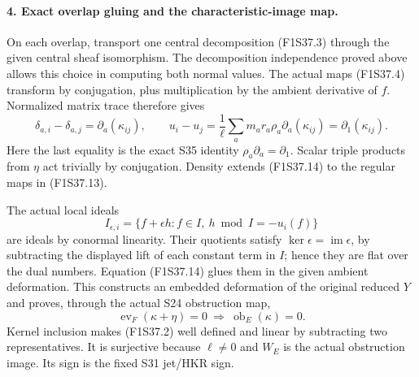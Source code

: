 \paragraph{4. Exact overlap gluing and the characteristic-image map.}
On each overlap, transport one central
decomposition (F1S37.3) through the
given central sheaf isomorphism. The
decomposition independence proved above
allows this choice in computing both
normal values. The actual maps
(F1S37.4) transform by conjugation,
plus multiplication by the ambient
derivative of $f$. Normalized matrix
trace therefore gives
\[
 \delta_{a,i}-\delta_{a,j}
                 =\partial_a(\kappa_{ij}),\qquad
 u_i-u_j=\frac1\ell\sum_a m_a r_a
                    \rho_a\partial_a(\kappa_{ij})
                 =\partial_1(\kappa_{ij}).
 \tag{F1S37.14}
\]
Here the last equality is the exact
S35 identity $\rho_a\partial_a=\partial_1$.
Scalar triple products from $\eta$
act trivially by conjugation. Density
extends (F1S37.14) to the regular maps
in (F1S37.13).

The actual local ideals
\[
 I_{\epsilon,i}=\{f+\epsilon h:f\in I,
                         \ h\bmod I=-u_i(f)\}
 \tag{F1S37.15}
\]
are ideals by conormal linearity.
Their quotients satisfy
$\ker\epsilon=\operatorname{im}\epsilon$,
by subtracting the displayed lift of
each constant term in $I$; hence they
are flat over the dual numbers.
Equation (F1S37.14) glues them in the
given ambient deformation. This constructs
an embedded deformation of the original
reduced $Y$ and proves, through the
actual S24 obstruction map,
\[
 \operatorname{ev}_F(\kappa+\eta)=0
          \ \Longrightarrow\ 
                       \operatorname{ob}_E(\kappa)=0.
 \tag{F1S37.16}
\]
Kernel inclusion makes (F1S37.2)
well defined and linear by subtracting
two representatives. It is surjective
because $\ell\ne0$ and $W_E$ is the
actual obstruction image. Its sign is
the fixed S31 jet/HKR sign.

